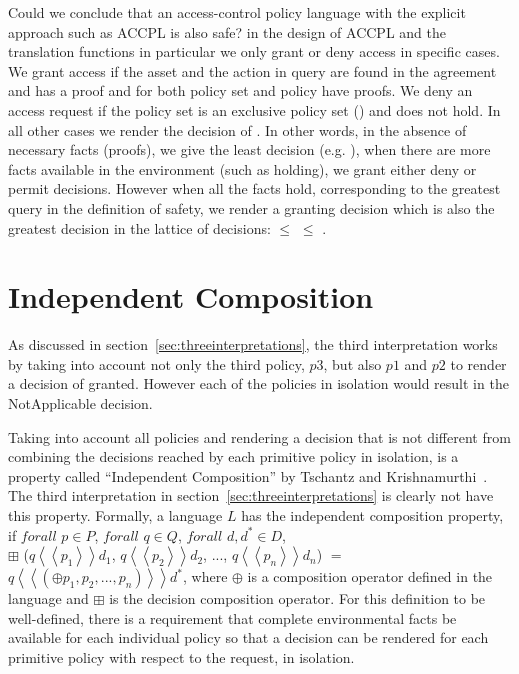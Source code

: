 Could we conclude that an access-control policy language with the explicit approach such as \ac{ACCPL} is also safe? in the design of \ac{ACCPL} and the translation functions in particular we only grant or deny access in specific cases. We grant access if the asset and the action in query are found in the agreement and  has a proof and  for both policy set and policy have proofs. We deny an access request if the policy set is an exclusive policy set () and  does not hold. In all other cases we render the decision of . In other words, in the absence of necessary facts (proofs), we give the least decision (e.g. ), when there are more facts available in the environment (such as  holding), we grant either deny or permit decisions. However when all the facts hold, corresponding to the greatest query in the definition of safety, we render a granting decision which is also the greatest decision in the lattice of decisions:  $\leq$  $\leq$ .


\section{Independent Composition}

As discussed in section~\ref{sec:threeinterpretations}, the third interpretation works by taking into account not only the third policy, $p3$, but also $p1$ and $p2$ to render a decision of granted. However each of the policies in isolation would result in the NotApplicable decision. 

Taking into account all policies and rendering a decision that is not different from combining the decisions reached by each primitive policy in isolation, is a property called ``Independent Composition'' by Tschantz and Krishnamurthi~\cite{Tschantz}. The third interpretation in section~\ref{sec:threeinterpretations} is clearly not have this property. Formally, a language $L$ has the independent composition property, if $forall$ $p \in P$, $forall$ $q \in Q$, $forall$ $d, d^\ast \in D$, \\$\boxplus$ ($q \left\langle\left\langle p_{1}  \right\rangle\right\rangle d_{1}$, $q \left\langle\left\langle p_{2}  \right\rangle\right\rangle d_{2}$, ..., $q \left\langle\left\langle p_{n}  \right\rangle\right\rangle d_{n}$) $=$ $q \left\langle\left\langle (\oplus p_{1}, p_{2}, ..., p_{n}) \right\rangle\right\rangle d^\ast$, where $\oplus$ is a composition operator defined in the language and $\boxplus$ is the decision composition operator. For this definition to be well-defined, there is a requirement that complete environmental facts be available for each individual policy so that a decision can be rendered for each primitive policy with respect to the request, in isolation.

